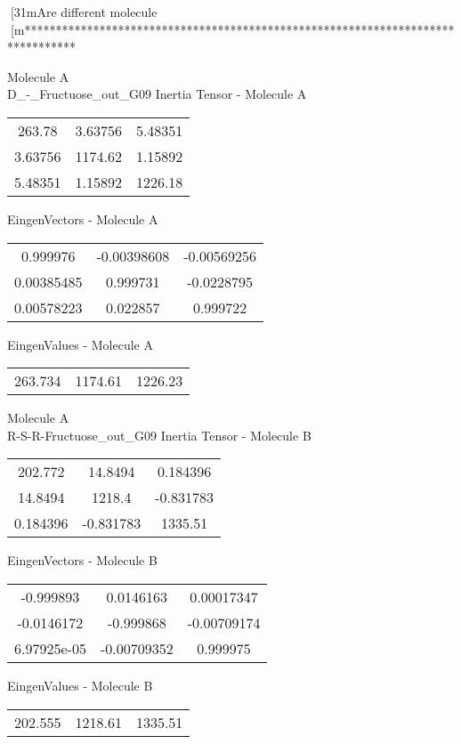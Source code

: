 [31mAre different molecule
[m********************************************************************************
\newpage
\begin{multicols}{2}
\begin{center}
Molecule A \\ 
D_-_Fructuose_out_G09
Inertia Tensor - Molecule A \\
\vtab
\begin{tabular}{|c c c|}
263.78	 & 	3.63756	 & 	5.48351	 \\
3.63756	 & 	1174.62	 & 	1.15892	 \\
5.48351	 & 	1.15892	 & 	1226.18
\end{tabular}

\vtab
 EingenVectors - Molecule A     \\
\vtab
\begin{tabular}{|c c c|}
0.999976	 & 	-0.00398608	 & 	-0.00569256	 \\
0.00385485	 & 	0.999731	 & 	-0.0228795	 \\
0.00578223	 & 	0.022857	 & 	0.999722
\end{tabular}

\vtab
 EingenValues - Molecule A     \\
\vtab
\begin{tabular}{|c c c|}
263.734	 & 	1174.61	 & 	1226.23
\end{tabular}
\columnbreak
Molecule A \\ 
R-S-R-Fructuose_out_G09
Inertia Tensor - Molecule B \\
\vtab
\begin{tabular}{|c c c|}
202.772	 & 	14.8494	 & 	0.184396	 \\
14.8494	 & 	1218.4	 & 	-0.831783	 \\
0.184396	 & 	-0.831783	 & 	1335.51
\end{tabular}

\vtab
 EingenVectors - Molecule B     \\
\vtab
\begin{tabular}{|c c c|}
-0.999893	 & 	0.0146163	 & 	0.00017347	 \\
-0.0146172	 & 	-0.999868	 & 	-0.00709174	 \\
6.97925e-05	 & 	-0.00709352	 & 	0.999975
\end{tabular}

\vtab
 EingenValues - Molecule B     \\
\vtab
\begin{tabular}{|c c c|}
202.555	 & 	1218.61	 & 	1335.51
\end{tabular}
\end{center}
\end{multicols}
